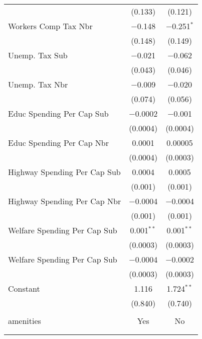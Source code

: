 \begin{table}[!htbp]
\begin{tabular}{@{\extracolsep{5pt}}lcc}
  & (0.133) & (0.121) \\ 
  Workers Comp Tax Nbr & $-$0.148 & $-$0.251$^{*}$ \\ 
  & (0.148) & (0.149) \\ 
  Unemp. Tax Sub & $-$0.021 & $-$0.062 \\ 
  & (0.043) & (0.046) \\ 
  Unemp. Tax Nbr & $-$0.009 & $-$0.020 \\ 
  & (0.074) & (0.056) \\ 
  Educ Spending Per Cap Sub & $-$0.0002 & $-$0.001 \\ 
  & (0.0004) & (0.0004) \\ 
  Educ Spending Per Cap Nbr & 0.0001 & 0.00005 \\ 
  & (0.0004) & (0.0003) \\ 
  Highway Spending Per Cap Sub & 0.0004 & 0.0005 \\ 
  & (0.001) & (0.001) \\ 
  Highway Spending Per Cap Nbr & $-$0.0004 & $-$0.0004 \\ 
  & (0.001) & (0.001) \\ 
  Welfare Spending Per Cap Sub & 0.001$^{**}$ & 0.001$^{**}$ \\ 
  & (0.0003) & (0.0003) \\ 
  Welfare Spending Per Cap Sub & $-$0.0004 & $-$0.0002 \\ 
  & (0.0003) & (0.0003) \\ 
  Constant & 1.116 & 1.724$^{**}$ \\ 
  & (0.840) & (0.740) \\ 
 \hline \\[-1.8ex] 
amenities & Yes & No \\ 
\hline \\[-1.8ex] 
\hline 
\hline \\[-1.8ex] 
\end{tabular} 
\end{table} 
